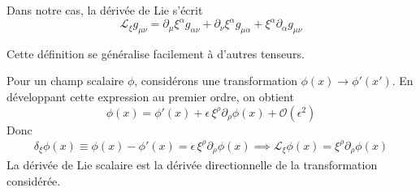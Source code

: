 Dans notre cas, la dérivée de Lie s'écrit
\begin{equation}
    \boxed{\mathcal{L}_{\xi}g_{\mu \nu} = \partial_{\mu}\xi^{\alpha}g_{\alpha \nu} + \partial_{\nu}\xi^{\alpha}g_{\mu \alpha} + \xi^{\alpha}\partial_{\alpha}g_{\mu \nu}}
\end{equation}

Cette définition se généralise facilement à d'autres tenseurs.
\begin{exmp}
    Pour un champ scalaire $\phi$, considérons une transformation $\phi(x) \to \phi'(x')$. En développant cette expression au premier ordre, on obtient
    \begin{equation}
        \phi (x) = \phi '(x) + \epsilon \, \xi^{\rho}\partial_{\rho}\phi(x) + \mathcal{O}(\epsilon^2)
    \end{equation}
    Donc
    \begin{align}
        \delta_{\xi}\phi(x) \equiv \phi(x) - \phi'(x) = \epsilon\,\xi^{\rho}\partial_{\rho}\phi(x)\implies \mathcal{L}_{\xi}\phi(x) = \xi^{\rho}\partial_{\rho}\phi(x)
    \end{align}
    La dérivée de Lie scalaire est la dérivée directionnelle de la transformation considérée. 
\end{exmp}
